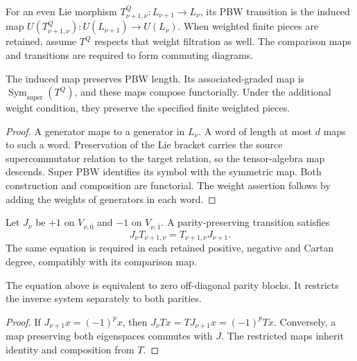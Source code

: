 \begin{definition}
\label{def:transition-pbw-filtration-datum}
For an even Lie morphism $T^Q_{\nu+1,\nu}:L_{\nu+1}\to L_\nu$,
its PBW transition is the induced map
$U(T^Q_{\nu+1,\nu}):U(L_{\nu+1})\to U(L_\nu)$.
When weighted finite pieces are retained, assume $T^Q$ respects
that weight filtration as well. The comparison maps and transitions
are required to form commuting diagrams.
\end{definition}

\begin{proposition}
\label{prop:transition-pbw-filtration-preservation-criterion}
The induced map preserves PBW length. Its associated-graded map is
$\operatorname{Sym}_{\mathrm{super}}(T^Q)$, and these maps compose
functorially. Under the additional weight condition, they preserve
the specified finite weighted pieces.
\end{proposition}
\begin{proof}
A generator maps to a generator in $L_\nu$. A word of length at
most $d$ maps to such a word. Preservation of the Lie bracket
carries the source supercommutator relation to the target relation,
so the tensor-algebra map descends. Super PBW identifies its symbol
with the symmetric map. Both construction and composition are
functorial. The weight assertion follows by adding the weights of
generators in each word.
\end{proof}

\begin{definition}
\label{def:transition-parity-decomposition-datum}
Let $J_\nu$ be $+1$ on $V_{\nu,\overline0}$ and $-1$ on
$V_{\nu,\overline1}$. A parity-preserving transition satisfies
\[
 J_\nu T_{\nu+1,\nu}=T_{\nu+1,\nu}J_{\nu+1}.
\]
The same equation is required in each retained positive, negative
and Cartan degree, compatibly with its comparison map.
\end{definition}

\begin{proposition}
\label{prop:transition-parity-decomposition-preservation-criterion}
The equation above is equivalent to zero off-diagonal parity
blocks. It restricts the inverse system separately to both parities.
\end{proposition}
\begin{proof}
If $J_{\nu+1}x=(-1)^px$, then
$J_\nu T x=TJ_{\nu+1}x=(-1)^pTx$.
Conversely, a map preserving both eigenspaces commutes with $J$.
The restricted maps inherit identity and composition from $T$.
\end{proof}

